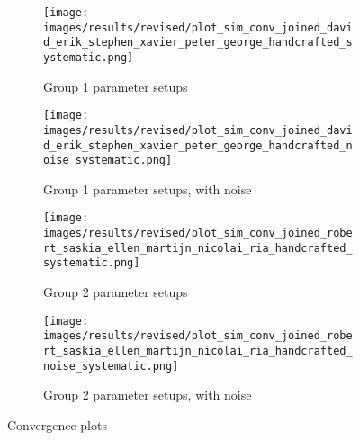 
\begin{figure}[ht]
	\begin{subfigure}{0.48\linewidth}
	\texttt{[image: images/results/revised/plot\_sim\_conv\_joined\_david\_erik\_stephen\_xavier\_peter\_george\_handcrafted\_systematic.png]}
	\caption{Group 1 parameter setups}
	\label{fig:conv_group1_handcrafted}
	\end{subfigure}
	\hfill
	\begin{subfigure}{0.48\linewidth}
	\texttt{[image: images/results/revised/plot\_sim\_conv\_joined\_david\_erik\_stephen\_xavier\_peter\_george\_handcrafted\_noise\_systematic.png]}
	\caption{Group 1 parameter setups, with noise}
	\label{fig:conv_group1_handcrafted_noise}
	\end{subfigure}
	\begin{subfigure}{0.48\linewidth}
	\texttt{[image: images/results/revised/plot\_sim\_conv\_joined\_robert\_saskia\_ellen\_martijn\_nicolai\_ria\_handcrafted\_systematic.png]}
	\caption{Group 2 parameter setups}
	\label{fig:conv_group2_handcrafted}
	\end{subfigure}
	\hfill
	\begin{subfigure}{0.48\linewidth}
	\texttt{[image: images/results/revised/plot\_sim\_conv\_joined\_robert\_saskia\_ellen\_martijn\_nicolai\_ria\_handcrafted\_noise\_systematic.png]}
	\caption{Group 2 parameter setups, with noise}
	\label{fig:conv_group2_handcrafted_noise}
	\end{subfigure}
	\caption{Convergence plots}
	\label{fig:conv_joined_with_without_placeholder2}
\end{figure}

